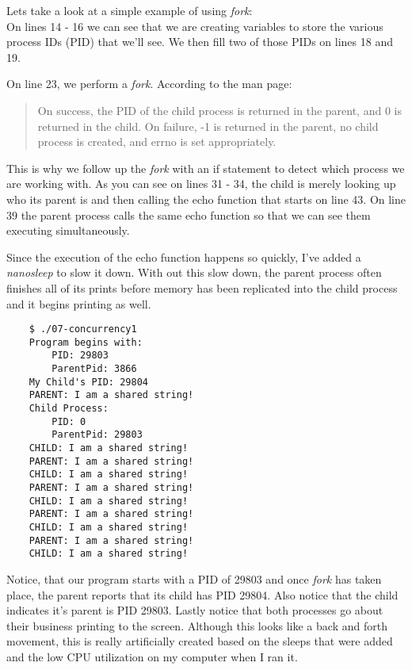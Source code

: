 \documentclass[../main.tex]{subfiles}
\begin{document}
	Lets take a look at a simple example of using \textit{fork}:\\
	
	
	
	On lines 14 - 16 we can see that we are creating variables to store the various process IDs (PID) that we'll see.  We then fill two of those PIDs on lines 18 and 19.
	
	On line 23, we perform a \textit{fork}.  According to the man page:
	
	\begin{quotation}
		On success, the PID of the child process is returned in the parent, and 0 is returned in the child.  On failure, -1 is returned in the parent, no child process is created, and errno is set appropriately.
	\end{quotation}

	This is why we follow up the \textit{fork} with an if statement to detect which process we are working with.  As you can see on lines 31 - 34, the child is merely looking up who its parent is and then calling the echo function that starts on line 43.  On line 39 the parent process calls the same echo function so that we can see them executing simultaneously.  
	
	Since the execution of the echo function happens so quickly, I've added a \textit{nanosleep} to slow it down.  With out this slow down, the parent process often finishes all of its prints before memory has been replicated into the child process and it begins printing as well.
	
	\begin{verbatim}
	$ ./07-concurrency1 
	Program begins with:
		PID: 29803
		ParentPid: 3866
	My Child's PID: 29804
	PARENT: I am a shared string!
	Child Process:
		PID: 0
		ParentPid: 29803
	CHILD: I am a shared string!
	PARENT: I am a shared string!
	CHILD: I am a shared string!
	PARENT: I am a shared string!
	CHILD: I am a shared string!
	PARENT: I am a shared string!
	CHILD: I am a shared string!
	PARENT: I am a shared string!
	CHILD: I am a shared string!
	\end{verbatim}
	
	Notice, that our program starts with a PID of 29803 and once \textit{fork} has taken place, the parent reports that its child has PID 29804.  Also notice that the child indicates it's parent is PID 29803.  Lastly notice that both processes go about their business printing to the screen.  Although this looks like a back and forth movement, this is really artificially created based on the sleeps that were added and the low CPU utilization on my computer when I ran it.
	
\end{document}
